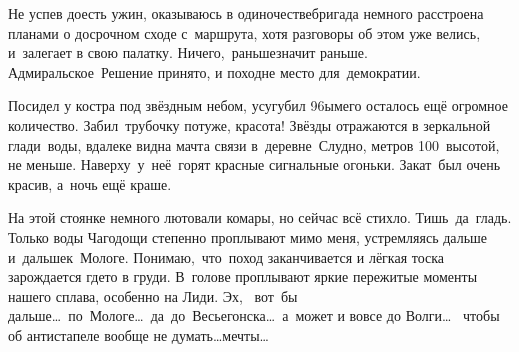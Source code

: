 Не успев доесть ужин, оказываюсь в одиночестве\mdash бригада немного расстроена планами о досрочном сходе с~маршрута, хотя разговоры об этом уже велись, и~залегает в свою палатку. Ничего,~раньше\mdash значит раньше. Адмиральское~Решение принято, и поход\mdash не место для~демократии. 

Посидел у костра под звёздным небом, усугубил 96\sdash ым\mdash его осталось ещё огромное количество. Забил~трубочку потуже, красота! Звёзды отражаются в зеркальной глади~воды, вдалеке видна мачта связи в~деревне~Слудно, метров 100~высотой, не меньше. Наверху~у~неё~горят красные сигнальные огоньки. Закат~был очень красив, а~ночь ещё краше. 

На этой стоянке немного лютовали комары, но сейчас всё стихло. Тишь~да~гладь. Только воды Чагодощи степенно проплывают мимо меня, устремляясь дальше и~дальше\mdash к~Мологе. Понимаю,~что~поход заканчивается и лёгкая тоска зарождается где\sdash то в груди. В~голове проплывают яркие пережитые моменты нашего сплава, особенно на Лиди. \newpage Эх,~ вот~бы дальше\ldots~по~Мологе\ldots~да~до~Весьегонска\ldots~а~может и вовсе до Волги\ldots~ чтобы об антистапеле вообще не думать\ldots мечты\ldots

\begin{center}
\end{center}